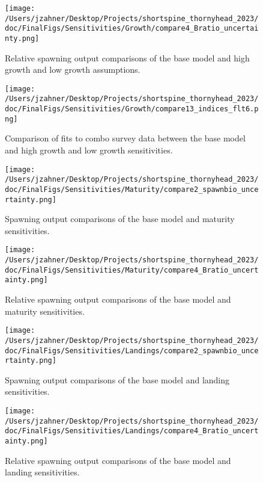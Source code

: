 \documentclass[11pt,
  english,
  letterpaper,
]{article}
\begin{document}
\begin{figure}
\centering
\texttt{[image: /Users/jzahner/Desktop/Projects/shortspine\_thornyhead\_2023/doc/FinalFigs/Sensitivities/Growth/compare4\_Bratio\_uncertainty.png]}
\caption{Relative spawning output comparisons of the base model and high growth and low growth assumptions.\label{fig:growth_sensitiv_mngmt}}
\end{figure}

\begin{figure}
\centering
\texttt{[image: /Users/jzahner/Desktop/Projects/shortspine\_thornyhead\_2023/doc/FinalFigs/Sensitivities/Growth/compare13\_indices\_flt6.png]}
\caption{Comparison of fits to combo survey data between the base model and high growth and low growth sensitivities.\label{fig:growth_sensitiv_indx}}
\end{figure}

\begin{figure}
\centering
\texttt{[image: /Users/jzahner/Desktop/Projects/shortspine\_thornyhead\_2023/doc/FinalFigs/Sensitivities/Maturity/compare2\_spawnbio\_uncertainty.png]}
\caption{Spawning output comparisons of the base model and maturity sensitivities.\label{fig:mat_sensitiv_spawning}}
\end{figure}

\begin{figure}
\centering
\texttt{[image: /Users/jzahner/Desktop/Projects/shortspine\_thornyhead\_2023/doc/FinalFigs/Sensitivities/Maturity/compare4\_Bratio\_uncertainty.png]}
\caption{Relative spawning output comparisons of the base model and maturity sensitivities.\label{fig:mat_sensitiv_mngmt}}
\end{figure}

\begin{figure}
\centering
\texttt{[image: /Users/jzahner/Desktop/Projects/shortspine\_thornyhead\_2023/doc/FinalFigs/Sensitivities/Landings/compare2\_spawnbio\_uncertainty.png]}
\caption{Spawning output comparisons of the base model and landing sensitivities.\label{fig:land_sensitiv_spawning}}
\end{figure}

\begin{figure}
\centering
\texttt{[image: /Users/jzahner/Desktop/Projects/shortspine\_thornyhead\_2023/doc/FinalFigs/Sensitivities/Landings/compare4\_Bratio\_uncertainty.png]}
\caption{Relative spawning output comparisons of the base model and landing sensitivities.\label{fig:land_sensitiv_mngmt}}
\end{figure}
\end{document}
